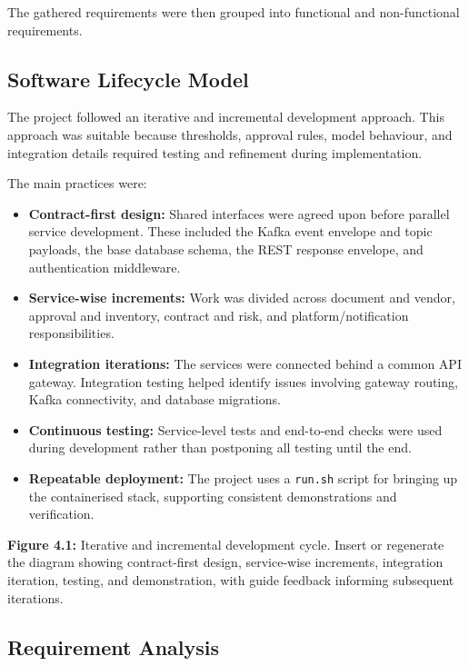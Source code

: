 \documentclass[12pt,a4paper]{report}
\begin{document}
The gathered requirements were then grouped into functional and
non-functional requirements.

\subsection{Software Lifecycle Model}

The project followed an iterative and incremental development approach.
This approach was suitable because thresholds, approval rules, model
behaviour, and integration details required testing and refinement
during implementation.

The main practices were:

\begin{itemize}
    \item \textbf{Contract-first design:}
    Shared interfaces were agreed upon before parallel service
    development. These included the Kafka event envelope and topic
    payloads, the base database schema, the REST response envelope,
    and authentication middleware.

    \item \textbf{Service-wise increments:}
    Work was divided across document and vendor, approval and inventory,
    contract and risk, and platform/notification responsibilities.

    \item \textbf{Integration iterations:}
    The services were connected behind a common API gateway.
    Integration testing helped identify issues involving gateway
    routing, Kafka connectivity, and database migrations.

    \item \textbf{Continuous testing:}
    Service-level tests and end-to-end checks were used during
    development rather than postponing all testing until the end.

    \item \textbf{Repeatable deployment:}
    The project uses a \texttt{run.sh} script for bringing up the
    containerised stack, supporting consistent demonstrations and
    verification.
\end{itemize}

\textbf{Figure 4.1:} Iterative and incremental development cycle.
Insert or regenerate the diagram showing contract-first design,
service-wise increments, integration iteration, testing, and
demonstration, with guide feedback informing subsequent iterations.

\subsection{Requirement Analysis}
\end{document}
